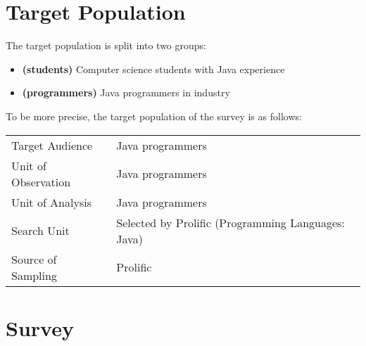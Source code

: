 \documentclass[%
class=scrreprt,
chapterprefix=false,%
open=right,%
twoside=false,%
paper=a4,%
logofile={Logo\_zentral\_farbig\_EN.png},%
thesistype=masterproposal,%
UKenglish,%
]{se2thesis}
\begin{document}
\section{Target Population} \label{target-population}
The target population is split into two groups:
\begin{itemize}
	\item \label{students} \textbf{(students)}
	Computer science students with Java experience
	\item \label{programmers} \textbf{(programmers)} Java programmers in industry
\end{itemize}

To be more precise, the target population of the survey is as follows:
\begin{center}
	\begin{tabular}{|l|l|}
		\hline
		Target Audience      & Java programmers \\
		Unit of Observation  & Java programmers \\
		Unit of Analysis     & Java programmers \\
		Search Unit %
		& Selected by Prolific (Programming Languages: Java)\\
		Source of Sampling   & %
		Prolific \\
		\hline
	\end{tabular}
\end{center}


\section{Survey}
\end{document}
